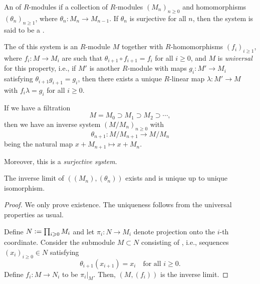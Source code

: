 \begin{defn}
	An  of $R$-modules if a collection of $R$-modules $(M_{n})_{n \ge 0}$ and homomorphisms $(\theta_{n})_{n \ge 1}$, where $\theta_{n} : M_{n} \to M_{n - 1}$. \newline
	If $\theta_{n}$ is surjective for all $n$, then the system is said to be a .

	The  of this system is an $R$-module $M$ together with $R$-homomorphisms $(f_{i})_{i \ge 1}$, where $f_{i} : M \to M_{i}$ are such that $\theta_{i + 1} \circ f_{i + 1} = f_{i}$ for all $i \ge 0$, and $M$ is \emph{universal} for this property, i.e., if $M'$ is another $R$-module with maps $g_{i} : M' \to M_{i}$ satisfying $\theta_{i + 1} g_{i + 1} = g_{i}$, then there exists a unique $R$-linear map $\lambda : M' \to M$ with $f_{i} \lambda = g_{i}$ for all $i \ge 0$.
\end{defn}

\begin{ex}
	If we have a filtration
	\begin{equation*} 
		M = M_{0} \supset M_{1} \supset M_{2} \supset \cdots,
	\end{equation*}
	then we have an inverse system $(M/M_{n})_{n \ge 0}$ with
	\begin{equation*} 
		\theta_{n + 1} : M/M_{n + 1} \to M/M_{n}
	\end{equation*}
	being the natural map $x + M_{n + 1} \mapsto x + M_{n}$.

	Moreover, this is a \emph{surjective system}.
\end{ex}

\begin{prop} \label{prop:inverse-limit-existence}
	The inverse limit of $((M_{n}), (\theta_{n}))$ exists and is unique up to unique isomorphism.
\end{prop}
\begin{proof} 
	We only prove existence. The uniqueness follows from the universal properties as usual.

	Define $N \vcentcolon= \prod_{i \ge 0} M_{i}$ and let $\pi_{i} : N \to M_{i}$ denote projection onto the $i$-th coordinate. \newline
	Consider the submodule $M \subset N$ consisting of , i.e., sequences $(x_{i})_{i \ge 0} \in N$ satisfying
	\begin{equation*} 
		\theta_{i + 1}(x_{i + 1}) = x_{i} \quad \text{for all } i \ge 0.
	\end{equation*}
	Define $f_{i} : M \to N_{i}$ to be $\pi_{i}|_{M}$. Then, $(M, (f_{i}))$ is the inverse limit.
\end{proof}

